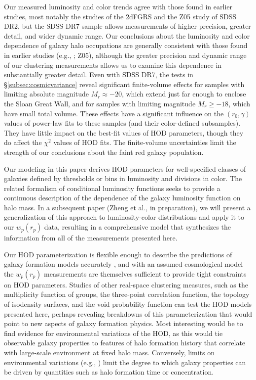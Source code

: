 \documentclass[]{emulateapj}
\newcommand{\wrp}{{w_p(r_p)}}
\begin{document}
Our measured luminosity and color trends agree with those found
in earlier studies, most notably the \cite{norberg01,norberg02}
studies of the 2dFGRS and the Z05 study of SDSS DR2,
but the SDSS DR7 sample allows measurements of higher precision,
greater detail, and wider dynamic range.
Our conclusions about the luminosity and color dependence of galaxy
halo occupations are generally consistent with those found in
earlier studies 
(e.g., \citealt{bosch03a,collister05,yang05b}; Z05),
although the greater precision and dynamic range of our
clustering measurements allows us to examine this dependence
in substantially greater detail.
Even with SDSS DR7, the tests in \S\ref{subsec:cosmicvariance}
reveal significant finite-volume effects for samples with
limiting absolute magnitude $M_r \approx -20$, which extend just
far enough to enclose the Sloan Great Wall, and for samples
with limiting magnitude $M_r \geq -18$, which have small
total volume.  These effects have a significant influence on
the $(r_0,\gamma)$ values of power-law fits to these samples
(and their color-defined subsamples).
They have little impact on the best-fit values of HOD parameters,
though they do affect the $\chi^2$ values of HOD fits.  
The finite-volume uncertainties limit the strength of our
conclusions about the faint red galaxy population.

Our modeling in this paper derives HOD parameters for well-specified
classes of galaxies defined by thresholds or bins in luminosity
and divisions in color.
The related formalism of conditional luminosity functions
\citep{yang03} seeks to provide a continuous description of the
dependence of the galaxy luminosity function on halo mass.
In a subsequent paper (Zheng et al., in preparation), we will
present a generalization of this approach to luminosity-color
distributions and apply it to our $\wrp$ data,
resulting in a comprehensive model that synthesizes the information
from all of the measurements presented here.

Our HOD parameterization is flexible enough to describe the predictions
of galaxy formation models accurately \citep{zheng05}, and with an
assumed cosmological model the $\wrp$ measurements are themselves
sufficient to provide tight constraints on HOD parameters.
Studies of other real-space clustering measures, such as the
multiplicity function of groups, the three-point correlation function,
the topology of isodensity surfaces, and the void probability function
can test the HOD models presented here, perhaps revealing breakdowns
of this parameterization that would point to new aspects of galaxy
formation physics.  Most interesting would be to find evidence for
environmental variations of the HOD, as this would tie observable
galaxy properties to features of halo formation history that 
correlate with large-scale environment at fixed halo mass.
Conversely, limits on environmental variations
(e.g., \citealt{blanton07,tinker08}) limit the degree to which
galaxy properties can be driven by
quantities such as halo formation time or concentration.
\end{document}
